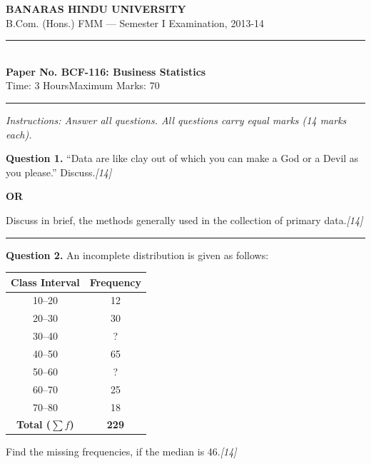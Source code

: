 \documentclass[11pt,a4paper]{article}
\newcommand{\pts}[1]{\hfill   \textit{[#1]}}
\begin{document}
\begin{center}
  {\large\bfseries BANARAS HINDU UNIVERSITY}\\[2pt]
  {\normalsize B.Com. (Hons.) FMM --- Semester I Examination, 2013-14}\\[6pt]
  \rule{0.8\linewidth}{0.5pt}\\[6pt]
  {\large\bfseries Paper No. BCF-116: Business Statistics}\\[4pt]
  {\normalsize Time: 3 Hours\hfill Maximum Marks: 70}
\end{center}

\rule{\linewidth}{0.4pt}

\smallskip



\noindent   \textit{Instructions: Answer all questions. All questions carry equal marks (14 marks each).}

\bigskip




\noindent   \textbf{Question 1.}
``Data are like clay out of which you can make a God or a Devil as you please.'' Discuss.\pts{14}

\centerline{   \textbf{OR}}

Discuss in brief, the methods generally used in the collection of primary data.\pts{14}

\medskip\rule{\linewidth}{0.2pt}

\pagebreak




\noindent   \textbf{Question 2.}
An incomplete distribution is given as follows:


\begin{center}
\small

\begin{tabular}{|c|c|}
\hline
   \textbf{Class Interval} &   \textbf{Frequency} \\
\hline
10--20 & 12 \\
20--30 & 30 \\
30--40 & ? \\
40--50 & 65 \\
50--60 & ? \\
60--70 & 25 \\
70--80 & 18 \\
\hline
   \textbf{Total ($\sum f$)} &   \textbf{229} \\
\hline
\end{tabular}
\end{center}

Find the missing frequencies, if the median is 46.\pts{14}
\end{document}
